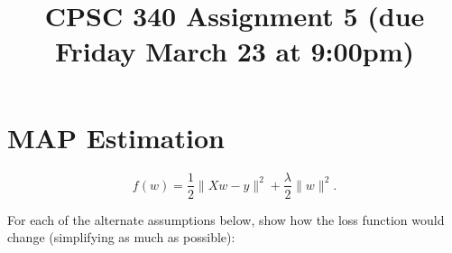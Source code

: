 \documentclass{article}
\def\blu#1{{\color{blu}#1}}
\def\norm#1{\|#1\|}
\begin{document}
\title{CPSC 340 Assignment 5 (due Friday March 23 at 9:00pm)}
\date{}
\maketitle

\vspace{-7em}

\vspace{1em}


\section{MAP Estimation}


\[
f(w) = \frac{1}{2}\norm{Xw - y}^2 + \frac \lambda 2 \norm{w}^2.
\]

\blu{For each of the alternate assumptions below, show how the loss function would change} (simplifying as much as possible):
\end{document}

